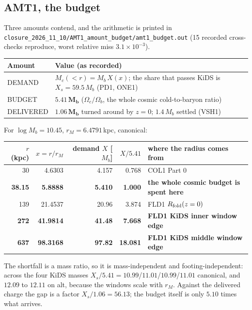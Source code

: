 \documentclass[10pt]{article}
\begin{document}
\subsection{AMT1, the budget}
Three amounts contend, and the arithmetic is printed in \texttt{closure\_2026\_11\_10/AMT1\_amount\_budget/amt1\_budget.out}
(15 recorded cross-checks reproduce, worst relative miss $3.1\times10^{-3}$).

\begin{center}\small
\begin{tabular}{@{}ll@{}}\toprule
Amount & Value (as recorded)\\\midrule
DEMAND & $M_c(<r)=M_b\,X(x)$; the share that passes KiDS is $X_s=59.5\,M_b$ (PD1, ONE1)\\
BUDGET & $\mathbf{5.41\,M_b}$ ($\Omega_c/\Omega_b$, the whole cosmic cold-to-baryon ratio)\\
DELIVERED & $\mathbf{1.06\,M_b}$ turned around by $z=0$; $1.4\,M_b$ settled (VSH1)\\\bottomrule
\end{tabular}
\end{center}

For $\log M_b=10.45$, $r_M=6.4791$\,kpc, canonical:

\begin{center}\small
\begin{tabular}{@{}rrrrl@{}}\toprule
$r$ (kpc) & $x=r/r_M$ & demand $X$ [$M_b$] & $X/5.41$ & where the radius comes from\\\midrule
30 & 4.6303 & 4.157 & 0.768 & COL1 Part 0\\
\textbf{38.15} & \textbf{5.8888} & \textbf{5.410} & \textbf{1.000} & \textbf{the whole cosmic budget is spent here}\\
139 & 21.4537 & 20.96 & 3.874 & FLD1 $R_{\rm fold}(z=0)$\\
\textbf{272} & \textbf{41.9814} & \textbf{41.48} & \textbf{7.668} & \textbf{FLD1 KiDS inner window edge}\\
\textbf{637} & \textbf{98.3168} & \textbf{97.82} & \textbf{18.081} & \textbf{FLD1 KiDS middle window edge}\\\bottomrule
\end{tabular}
\end{center}

The shortfall is a mass ratio, so it is mass-independent and footing-independent: across the four KiDS masses
$X_s/5.41 = 10.99$/$11.01$/$10.99$/$11.01$ canonical, and $12.09$ to $12.11$ on alt, because the windows scale with
$r_M$. Against the delivered charge the gap is a factor
$X_s/1.06 = 56.13$; the budget itself is only $5.10$ times what arrives.
\end{document}
